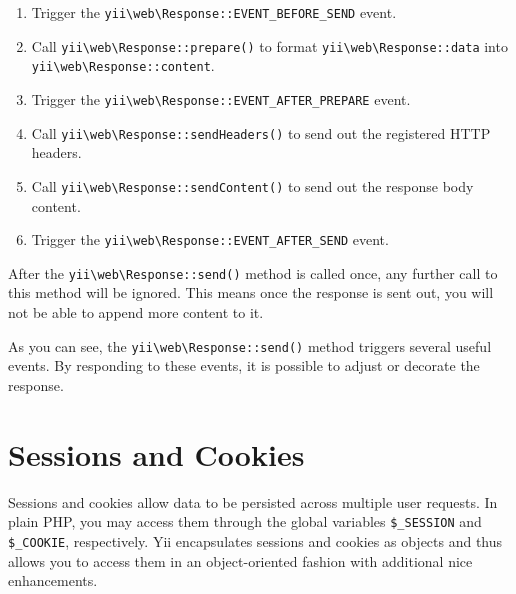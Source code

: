 \begin{enumerate}
\item Trigger the \texttt{yii{\allowbreak{}\textbackslash}web{\allowbreak{}\textbackslash}Response\allowbreak{}::\allowbreak{}EVENT\_BEFORE\_SEND} event.
\item Call \texttt{yii{\allowbreak{}\textbackslash}web{\allowbreak{}\textbackslash}Response\allowbreak{}::\allowbreak{}prepare()} to format \texttt{yii{\allowbreak{}\textbackslash}web{\allowbreak{}\textbackslash}Response\allowbreak{}::\allowbreak{}data} into 
\texttt{yii{\allowbreak{}\textbackslash}web{\allowbreak{}\textbackslash}Response\allowbreak{}::\allowbreak{}content}.
\item Trigger the \texttt{yii{\allowbreak{}\textbackslash}web{\allowbreak{}\textbackslash}Response\allowbreak{}::\allowbreak{}EVENT\_AFTER\_PREPARE} event.
\item Call \texttt{yii{\allowbreak{}\textbackslash}web{\allowbreak{}\textbackslash}Response\allowbreak{}::\allowbreak{}sendHeaders()} to send out the registered HTTP headers.
\item Call \texttt{yii{\allowbreak{}\textbackslash}web{\allowbreak{}\textbackslash}Response\allowbreak{}::\allowbreak{}sendContent()} to send out the response body content.
\item Trigger the \texttt{yii{\allowbreak{}\textbackslash}web{\allowbreak{}\textbackslash}Response\allowbreak{}::\allowbreak{}EVENT\_AFTER\_SEND} event.
\end{enumerate}
After the \texttt{yii{\allowbreak{}\textbackslash}web{\allowbreak{}\textbackslash}Response\allowbreak{}::\allowbreak{}send()} method is called once, any further call to this method will be ignored.
This means once the response is sent out, you will not be able to append more content to it.

As you can see, the \texttt{yii{\allowbreak{}\textbackslash}web{\allowbreak{}\textbackslash}Response\allowbreak{}::\allowbreak{}send()} method triggers several useful events. By responding to
these events, it is possible to adjust or decorate the response.



\label{runtime-sessions-cookies.md}\section{Sessions and Cookies}
Sessions and cookies allow data to be persisted across multiple user requests. In plain PHP, you may access them
through the global variables \lstinline|$_SESSION| and \lstinline|$_COOKIE|, respectively. Yii encapsulates sessions and cookies as objects
and thus allows you to access them in an object-oriented fashion with additional nice enhancements.

